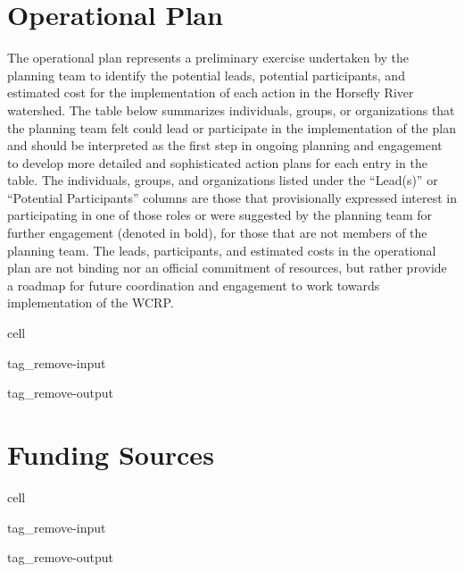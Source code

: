 \documentclass[letterpaper,10pt,english]{jupyterBook}
\let\sphinxpxdimen\pdfpxdimen\else\newdimen\sphinxpxdimen
\begin{document}
\begin{figure}[htbp]
\centering
\capstart

\noindent\sphinxincludegraphics[width=1000\sphinxpxdimen,height=400\sphinxpxdimen]{{figure7}.png}
\caption{}\label{\detokenize{EcoAttributes:fig7}}\end{figure}


\chapter{Operational Plan}
\label{\detokenize{EcoAttributes:operational-plan}}
\sphinxAtStartPar
The operational plan represents a preliminary exercise undertaken by the planning team to identify the potential leads, potential participants, and estimated cost for the implementation of each action in the Horsefly River watershed. The table below summarizes individuals, groups, or organizations that the planning team felt could lead or participate in the implementation of the plan and should be interpreted as the first step in on\sphinxhyphen{}going planning and engagement to develop more detailed and sophisticated action plans for each entry in the table. The individuals, groups, and organizations listed under the “Lead(s)” or “Potential Participants” columns are those that provisionally expressed interest in participating in one of those roles or were suggested by the planning team for further engagement (denoted in bold), for those that are not members of the planning team. The leads, participants, and estimated costs in the operational plan are not binding nor an official commitment of resources, but rather provide a roadmap for future coordination and engagement to work towards implementation of the WCRP.

\begin{sphinxuseclass}{cell}
\begin{sphinxuseclass}{tag_remove-input}
\begin{sphinxuseclass}{tag_remove-output}
\end{sphinxuseclass}
\end{sphinxuseclass}
\end{sphinxuseclass}

\chapter{Funding Sources}
\label{\detokenize{EcoAttributes:funding-sources}}
\begin{sphinxuseclass}{cell}
\begin{sphinxuseclass}{tag_remove-input}
\begin{sphinxuseclass}{tag_remove-output}
\end{sphinxuseclass}
\end{sphinxuseclass}
\end{sphinxuseclass}
\sphinxstepscope
\end{document}
